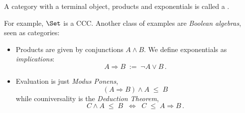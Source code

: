 \documentclass[12pt]{article}
\begin{document}
\begin{mydefinition}%
A category with a terminal object, products and exponentials is called a . \deq
\end{mydefinition}
%
For example, $\Set$ is a CCC. Another class of examples are \emph{Boolean algebras}, seen as categories:
\begin{itemize}
  \item Products are given by conjunctions $A \wedge B$. We define exponentials as \emph{implications}:
    \[ A \Rightarrow B \; := \; \neg A \vee B\,. \]
  \item Evaluation is just \emph{Modus Ponens},
    \[ (A \Rightarrow B) \wedge A \;\leq\; B \]
    while couniversality is the \emph{Deduction Theorem},
    \[ C \wedge A \;\leq\; B \;\; \Longleftrightarrow \;\; C \;\leq\; A \Rightarrow B\,. \]
\end{itemize}
\end{document}
